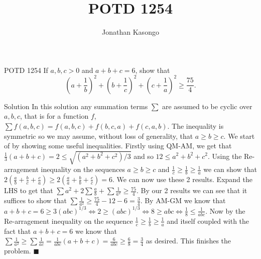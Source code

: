 \documentclass{article}
\author{Jonathan Kasongo}
\title{POTD 1254}
\begin{document}
\maketitle

\begin{problem}{POTD 1254}
If $a, b, c>0$ and $a+b+c=6$, show that
$$
\left(a+\frac{1}{b}\right)^2+\left(b+\frac{1}{c}\right)^2+\left(c+\frac{1}{a}\right)^2 \geq \frac{75}{4} .
$$
\end{problem}

\begin{solution}{Solution}
In this solution any summation terms $\sum$ are assumed to be cyclic over
$a,b,c$, that is for a function $f$, $\sum f(a,b,c) = f(a,b,c) + f(b,c,a) + f(c,a,b)$.
The inequality is symmetric so we may assume, without loss of generality,
that $a\geq b\geq c$. We start of by showing some useful inequalities.
Firstly using QM-AM, we get that $\frac{1}{3} (a+b+c) = 2 \leq
\sqrt{(a^2 + b^2 + c^2) / 3}$ and so $12 \leq a^2 + b^2 + c^2$. Using
the Re-arragement inequality on the sequences $a\geq b\geq c$ and
$\frac{1}{c} \geq \frac{1}{b} \geq \frac{1}{a}$ we can show that
$2\left(\frac{a}{b} + \frac{b}{c} + \frac{c}{a}\right) \geq
2\left(\frac{a}{a} + \frac{b}{b} + \frac{c}{c}\right)=6$.
We can now use these 2 results. Expand the LHS to get that
$\sum a^2 + 2\sum \frac{a}{b} + \sum \frac{1}{a^2} \geq
\frac{75}{4}$.
By our 2 results we can see that it suffices to show that
$\sum \frac{1}{a^2} \geq \frac{75}{4} - 12 - 6 = \frac{3}{4}$.
By AM-GM we know that $a+b+c=6\geq 3(abc)^{1/3} \iff 2\geq (abc)^{1/3}
\iff 8 \geq abc \iff \frac{1}{8} \leq \frac{1}{abc}$. Now by the
Re-arragement inequality on the sequence $\frac{1}{c} \geq \frac{1}{b} \geq
\frac{1}{a}$ and itself coupled with the fact that $a+b+c=6$ we know that
$\sum \frac{1}{a^2} \geq \sum
\frac{1}{ac} = \frac{1}{abc} (a+b+c) = \frac{6}{abc} \geq \frac{6}{8} =
\frac{3}{4}$ as desired. This finishes the problem. $\blacksquare$
\end{solution}
\end{document}
